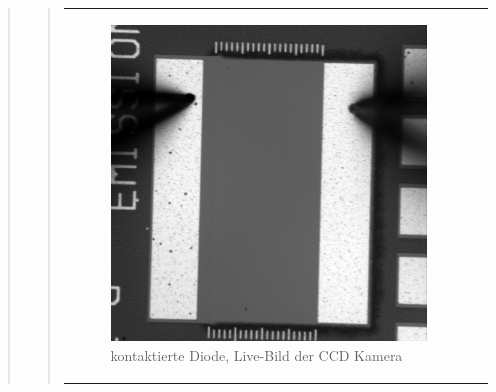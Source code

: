 \begin{quote}
\begin{quote}
        
         \begin{center}
                \begin{tabular}{ll}
    
                \hspace{-10em}
                    \begin{minipage}{0.6\textwidth}
    
                        \begin{figure}[H]
                            \label{fig:}
                            \includegraphics[scale=0.25, trim = 0cm 0cm 0cm
                            0cm,
                            clip]{./Emissionsbilder/drei/nach_Kontaktierung.jpg}
                            \caption{kontaktierte Diode, Live-Bild der CCD
                            Kamera}
                        \end{figure}
    
                    \end{minipage}
                    \begin{minipage}{0.6\textwidth}
    

\end{minipage}
\end{tabular}
\end{center}
\end{quote}
\end{quote}
